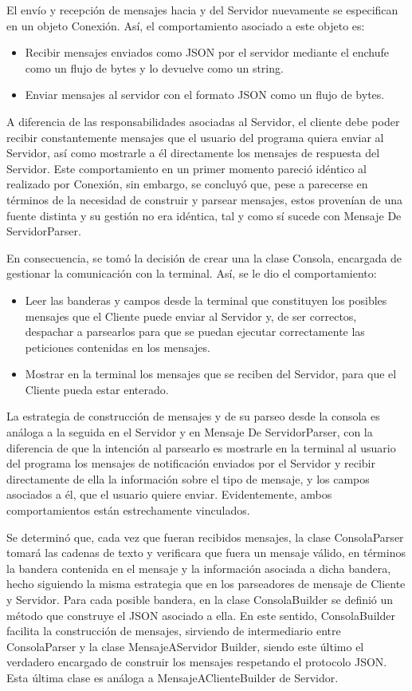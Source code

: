 \documentclass[11pt, a4paper]{article}
\begin{document}
El envío y recepción de mensajes hacia y del Servidor nuevamente se especifican en un objeto Conexión. Así, el comportamiento asociado a este objeto es:
\begin{itemize}
    \item Recibir mensajes enviados como JSON por el servidor mediante el enchufe como un flujo de bytes y lo devuelve como un string.
    \item Enviar mensajes al servidor con el formato JSON como un flujo de bytes.
\end{itemize}

A diferencia de las responsabilidades asociadas al Servidor, el cliente debe poder recibir constantemente mensajes que el usuario del programa quiera enviar al Servidor, así como mostrarle a él directamente los mensajes de respuesta del Servidor. Este comportamiento en un primer momento pareció idéntico al realizado por Conexión, sin embargo, se concluyó que, pese a parecerse en términos de la necesidad de construir y parsear mensajes, estos provenían de una fuente distinta y su gestión no era idéntica, tal y como sí sucede con Mensaje De ServidorParser.

En consecuencia, se tomó la decisión de crear una la clase Consola, encargada de gestionar la comunicación con la terminal. Así, se le dio el comportamiento:
\begin{itemize}
    \item Leer las banderas y campos desde la terminal que constituyen los posibles mensajes que el Cliente puede enviar al Servidor y, de ser correctos, despachar a parsearlos para que se puedan ejecutar correctamente las peticiones contenidas en los mensajes.
    \item Mostrar en la terminal los mensajes que se reciben del Servidor, para que el Cliente pueda estar enterado.
\end{itemize}

La estrategia de construcción de mensajes y de su parseo desde la consola es análoga a la seguida en el Servidor y en Mensaje De ServidorParser, con la diferencia de que la intención al parsearlo es mostrarle en la terminal al usuario del programa los mensajes de notificación enviados por el Servidor y recibir directamente de ella la información sobre el tipo de mensaje, y los campos asociados a él, que el usuario quiere enviar. Evidentemente, ambos comportamientos están estrechamente vinculados.

Se determinó que, cada vez que fueran recibidos mensajes, la clase ConsolaParser tomará las cadenas de texto y verificara que fuera un mensaje válido, en términos la bandera contenida en el mensaje y la información asociada a dicha bandera, hecho siguiendo la misma estrategia que en los parseadores de mensaje de Cliente y Servidor. Para cada posible bandera, en la clase ConsolaBuilder se definió un método que construye el JSON asociado a ella. En este sentido, ConsolaBuilder facilita la construcción de mensajes, sirviendo de intermediario entre ConsolaParser y la clase MensajeAServidor Builder, siendo este último el verdadero encargado de construir los mensajes respetando el protocolo JSON. Esta última clase es análoga a MensajeAClienteBuilder de Servidor.
\end{document}
